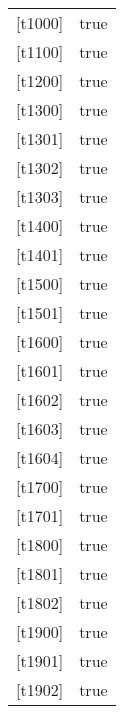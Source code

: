 \documentclass[a4]{article}
\begin{document}
\begin{table}[h]
\begin{tabular}{ll}
        \multicolumn{1}{l|}{{[}t1000{]}} & true  \\
        \multicolumn{1}{l|}{{[}t1100{]}} & true  \\
        \multicolumn{1}{l|}{{[}t1200{]}} & true  \\
        \multicolumn{1}{l|}{{[}t1300{]}} & true  \\
        \multicolumn{1}{l|}{{[}t1301{]}} & true  \\
        \multicolumn{1}{l|}{{[}t1302{]}} & true  \\
        \multicolumn{1}{l|}{{[}t1303{]}} & true  \\
        \multicolumn{1}{l|}{{[}t1400{]}} & true  \\
        \multicolumn{1}{l|}{{[}t1401{]}} & true  \\
        \multicolumn{1}{l|}{{[}t1500{]}} & true  \\
        \multicolumn{1}{l|}{{[}t1501{]}} & true  \\
        \multicolumn{1}{l|}{{[}t1600{]}} & true  \\
        \multicolumn{1}{l|}{{[}t1601{]}} & true  \\
        \multicolumn{1}{l|}{{[}t1602{]}} & true  \\
        \multicolumn{1}{l|}{{[}t1603{]}} & true  \\
        \multicolumn{1}{l|}{{[}t1604{]}} & true  \\
        \multicolumn{1}{l|}{{[}t1700{]}} & true  \\
        \multicolumn{1}{l|}{{[}t1701{]}} & true  \\
        \multicolumn{1}{l|}{{[}t1800{]}} & true  \\
        \multicolumn{1}{l|}{{[}t1801{]}} & true  \\
        \multicolumn{1}{l|}{{[}t1802{]}} & true  \\
        \multicolumn{1}{l|}{{[}t1900{]}} & true  \\
        \multicolumn{1}{l|}{{[}t1901{]}} & true  \\
        \multicolumn{1}{l|}{{[}t1902{]}} & true
    \end{tabular}
\end{table}
\end{document}
